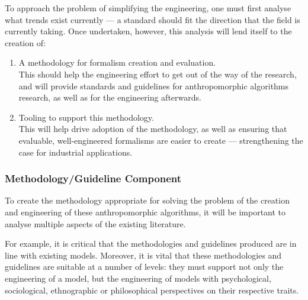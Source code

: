 To approach the problem of simplifying the engineering, one must first analyse what trends exist currently --- a standard should fit the direction that the field is currently taking. Once undertaken, however, this analysis will lend itself to the creation of:
\begin{enumerate}
    \item A methodology for formalism creation and evaluation.\\
    This should help the engineering effort to get out of the way of the research, and will provide standards and guidelines for anthropomorphic algorithms research, as well as for the engineering afterwards.
    \item Tooling to support this methodology.\\
    This will help drive adoption of the methodology, as well as ensuring that evaluable, well-engineered formalisms are easier to create --- strengthening the case for industrial applications.
\end{enumerate}

\subsubsection*{Methodology/Guideline Component}\label{sec:methodology}
To create the methodology appropriate for solving the problem of the creation and engineering of these anthropomorphic algorithms, it will be important to analyse multiple aspects of the existing literature.\par

For example, it is critical that the methodologies and guidelines produced are in line with existing models. Moreover, it is vital that these methodologies and guidelines are suitable at a number of levels: they must support not only the engineering of a model, but the engineering of models with psychological, sociological, ethnographic or philosophical perspectives on their respective traits.\par


